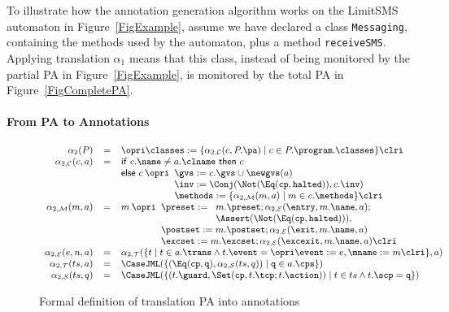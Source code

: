 To illustrate how the annotation generation algorithm
works on the LimitSMS automaton in Figure~\ref{FigExample}, assume
we have declared a class \texttt{Messaging}, containing the
methods used by the automaton, plus a method \texttt{receiveSMS}.
Applying translation \(\alpha_1\) means that this class, instead of
being monitored by the partial PA in Figure~\ref{FigExample}, is
monitored by the total PA in Figure~\ref{FigCompletePA}.


\paragraph{From PA to Annotations}
\begin{figure}[t]
\[{\small
\begin{array}{rcl}
\alpha_2(P) & = &\opri \classes :=
\{\alpha_{2, \mathcal{C}}(c, P.\pa) \mid c \in P.\program.\classes\} \clri\\

\alpha_{2,\mathcal{C}}(c, a) & = &
\mathsf{if\ }c.\name \not = a.\clname \mathsf{\ then\ }c\\
&&
\mathsf{else\ }c \:\opri
 \begin{array}[t]{l}
 \gvs := c.\gvs \cup \newgvs(a)\\
 \inv := \Conj(\Not(\Eq(\texttt{cp}, \texttt{halted})), c.\inv)\\
 \methods := \{\alpha_{2,\mathcal{M}}(m, a) \mid m \in c.\methods\} \clri
\end{array}\\
\alpha_{2,\mathcal{M}}(m, a) & = & m \: \opri
  \begin{array}[t]{l}
  \preset := \begin{array}[t]{l}
             m.\preset; \alpha_{2,\mathcal{E}}(\entry, m.\name, a);\\
             \Assert(\Not(\Eq(\texttt{cp}, \texttt{halted}))),
             \end{array}\\
  \postset := m.\postset; \alpha_{2, \mathcal{E}}(\exit, m.\name, a)\\
  \excset := m.\excset; \alpha_{2, \mathcal{E}}(\excexit, m.\name, a)
  \clri
  \end{array}\\
\alpha_{2, \mathcal{E}}(e, n, a) & = &
  \alpha_{2, \mathcal{T}}(\{t \mid t \in a.\trans \wedge
                                   t.\event = \opri \event := e,
                                                    \mname := m \clri
                           \}, a)\\
\alpha_{2, \mathcal{T}}(ts, a) & = &
  \CaseJML(
    \{(\Eq(\texttt{cp}, \texttt{q}), \alpha_{2, \mathcal{S}}(ts, q))
      \mid \texttt{q} \in a.\cps
    \})\\
\alpha_{2, \mathcal{S}}(ts, q) & = &
       \CaseJML(\{(t.\guard, \Set(\texttt{cp}, t.\tcp; t.\action)) \mid
                  t \in ts \wedge t.\scp = \texttt{q}
               \})
\end{array}}
\]
\caption{Formal definition of translation PA into annotations}
\label{FigPAtoAnnot}
\end{figure}


